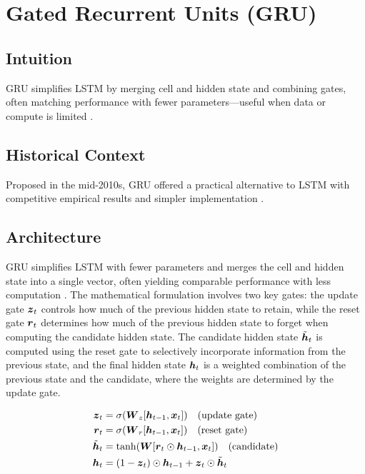 
\section{Gated Recurrent Units (GRU) }
\label{sec:gru}

\subsection*{Intuition}

GRU simplifies LSTM by merging cell and hidden state and combining gates, often matching performance with fewer parameters—useful when data or compute is limited \cite{Cho2014,GoodfellowEtAl2016}.

\subsection*{Historical Context}

Proposed in the mid-2010s, GRU offered a practical alternative to LSTM with competitive empirical results and simpler implementation \cite{Cho2014}.


\subsection{Architecture}

GRU simplifies LSTM with fewer parameters and merges the cell and hidden state into a single vector, often yielding comparable performance with less computation \cite{Cho2014,GoodfellowEtAl2016}. The mathematical formulation involves two key gates: the update gate $\boldsymbol{z}_t$ controls how much of the previous hidden state to retain, while the reset gate $\boldsymbol{r}_t$ determines how much of the previous hidden state to forget when computing the candidate hidden state. The candidate hidden state $\tilde{\boldsymbol{h}}_t$ is computed using the reset gate to selectively incorporate information from the previous state, and the final hidden state $\boldsymbol{h}_t$ is a weighted combination of the previous state and the candidate, where the weights are determined by the update gate.

\begin{align}
\boldsymbol{z}_t &= \sigma(\boldsymbol{W}_z [\boldsymbol{h}_{t-1}, \boldsymbol{x}_t]) \quad \text{(update gate)} \\
\boldsymbol{r}_t &= \sigma(\boldsymbol{W}_r [\boldsymbol{h}_{t-1}, \boldsymbol{x}_t]) \quad \text{(reset gate)} \\
\tilde{\boldsymbol{h}}_t &= \tanh(\boldsymbol{W} [\boldsymbol{r}_t \odot \boldsymbol{h}_{t-1}, \boldsymbol{x}_t]) \quad \text{(candidate)} \\
\boldsymbol{h}_t &= (1 - \boldsymbol{z}_t) \odot \boldsymbol{h}_{t-1} + \boldsymbol{z}_t \odot \tilde{\boldsymbol{h}}_t
\end{align}

